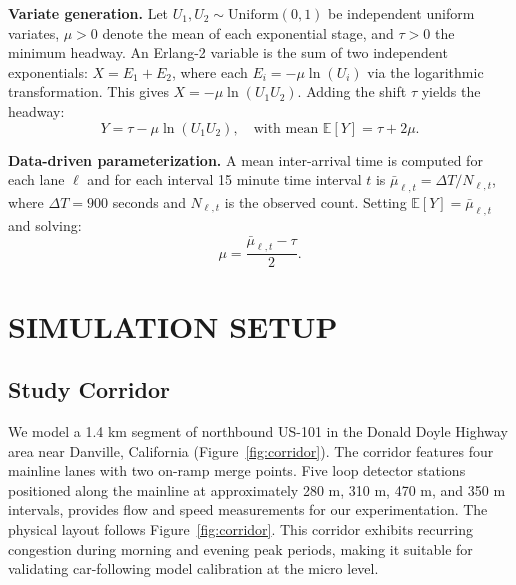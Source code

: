\documentclass{scspaperproc}
\theoremstyle{scsthe}
\begin{document}
\textbf{Variate generation.} Let $U_1, U_2 \sim \text{Uniform}(0,1)$ be independent uniform variates, $\mu > 0$ denote the mean of each exponential stage, and $\tau > 0$ the minimum headway. An Erlang-2 variable is the sum of two independent exponentials: $X = E_1 + E_2$, where each $E_i = -\mu \ln(U_i)$ via the logarithmic transformation. This gives $X = -\mu \ln(U_1 U_2)$. Adding the shift $\tau$ yields the headway:
\begin{equation}
\label{eq:erlang-variate}
Y = \tau - \mu \ln(U_1 U_2), \quad \text{with mean } \mathbb{E}[Y] = \tau + 2\mu.
\end{equation}

\textbf{Data-driven parameterization.}
A mean inter-arrival time is computed for each lane $\ell$ and for each interval 15 minute time interval $t$ is $\bar{\mu}_{\ell,t} = \Delta T / N_{\ell,t}$, where $\Delta T = 900$ seconds and $N_{\ell,t}$ is the observed count. Setting $\mathbb{E}[Y] = \bar{\mu}_{\ell,t}$ and solving:
\begin{equation}
\label{eq:erlang-param}
\mu = \frac{\bar{\mu}_{\ell,t} - \tau}{2}.
\end{equation}

\section{SIMULATION SETUP}
\label{sec:setup}
\subsection{Study Corridor}
We model a 1.4 km segment of northbound US-101 in the Donald Doyle Highway area  near Danville, California (Figure~\ref{fig:corridor}). The corridor features four mainline lanes with two on-ramp merge points. Five loop detector stations positioned along the mainline at approximately 280 m, 310 m, 470 m, and 350 m intervals, provides flow and speed measurements for our experimentation.
The physical layout follows Figure~\ref{fig:corridor}. This corridor exhibits recurring congestion
during morning and evening peak periods, making it suitable for validating car-following model calibration at the micro level.
\end{document}
